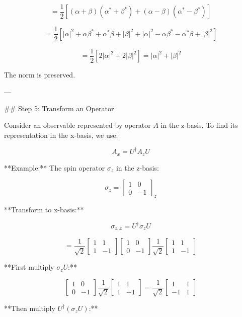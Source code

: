 $$= \frac{1}{2}[(\alpha + \beta)(\alpha^* + \beta^*) + (\alpha - \beta)(\alpha^* - \beta^*)]$$

$$= \frac{1}{2}[|\alpha|^2 + \alpha\beta^* + \alpha^*\beta + |\beta|^2 + |\alpha|^2 - \alpha\beta^* - \alpha^*\beta + |\beta|^2]$$

$$= \frac{1}{2}[2|\alpha|^2 + 2|\beta|^2] = |\alpha|^2 + |\beta|^2$$

The norm is preserved.

---

## Step 5: Transform an Operator

Consider an observable represented by operator $A$ in the z-basis. To find its representation in the x-basis, we use:

$$A_x = U^\dagger A_z U$$

**Example:** The spin operator $\sigma_z$ in the z-basis:

$$\sigma_z = \begin{bmatrix} 1 & 0 \\ 0 & -1 \end{bmatrix}_z$$

**Transform to x-basis:**

$$\sigma_{z,x} = U^\dagger \sigma_z U$$

$$= \frac{1}{\sqrt{2}}\begin{bmatrix} 1 & 1 \\ 1 & -1 \end{bmatrix} \begin{bmatrix} 1 & 0 \\ 0 & -1 \end{bmatrix} \frac{1}{\sqrt{2}}\begin{bmatrix} 1 & 1 \\ 1 & -1 \end{bmatrix}$$

**First multiply $\sigma_z U$:**

$$\begin{bmatrix} 1 & 0 \\ 0 & -1 \end{bmatrix} \frac{1}{\sqrt{2}}\begin{bmatrix} 1 & 1 \\ 1 & -1 \end{bmatrix} = \frac{1}{\sqrt{2}}\begin{bmatrix} 1 & 1 \\ -1 & 1 \end{bmatrix}$$

**Then multiply $U^\dagger (\sigma_z U)$:**

